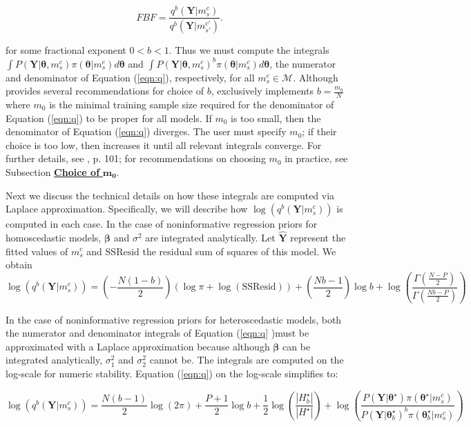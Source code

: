 $$FBF=\frac{q^b(\boldsymbol{Y}|m_s^c)}{q^b(\boldsymbol{Y}|m_{s'}^{c'})}.$$

\noindent 
for some fractional exponent $0<b<1$. Thus we must compute the integrals $\int P(\boldsymbol{Y}|\boldsymbol{\theta},m_s^c)\pi(\boldsymbol{\theta}|m_s^c)d\boldsymbol{\theta}$ and $\int P(\boldsymbol{Y}|\boldsymbol{\theta},m_s^c)^b\pi(\boldsymbol{\theta}|m_s^c)d\boldsymbol{\theta}$, the numerator and denominator of Equation (\ref{eqn:q}), respectively, for all $m_s^c\in \mathcal{M}$. Although \citet{OHaganfbfs} provides several recommendations for choice of $b$,  exclusively implements $b=\frac{m_0}{N}$ where $m_0$ is the minimal training sample size required for the denominator of Equation (\ref{eqn:q}) to be proper for all models. If $m_0$ is too small, then the denominator of Equation (\ref{eqn:q}) diverges. The user must specify $m_0$; if their choice is too low, then  increases it until all relevant integrals converge. For further details, see \citet{OHaganfbfs}, p. 101; for recommendations on choosing $m_0$ in practice, see Subsection \hyperlink{subsection:m0}{\textbf{Choice of }$\mathbf{m_0}$}. 

Next we discuss the technical details on how these integrals are computed via Laplace approximation. Specifically, we will describe how $\log\left(q^b(\boldsymbol{Y}|m_s^c)\right)$ is computed in each case. In the case of noninformative regression priors for homoscedastic models, $\boldsymbol{\beta}$ and $\sigma^2$ are integrated analytically. Let $\hat{\boldsymbol{Y}}$ represent the fitted values of $m_s^c$ and $\text{SSResid}$ the residual sum of squares of this model. We obtain 
\begin{equation}
\log\left(q^b(\boldsymbol{Y}|m_s^c)\right)=\left(-\frac{N(1-b)}{2}\right)(\log\pi+\log(\text{SSResid}))+\left({\frac{Nb-1}{2}}\right)\log b+\log\left(\frac{\Gamma\left(\frac{ N-P}{2}\right)}{\Gamma\left(\frac{Nb-P}{2}\right)}\right)
\end{equation}

\noindent In the case of noninformative regression priors for heteroscedastic models, both the numerator and denominator integrals of Equation (\ref{eqn:q} )must be approximated with a Laplace approximation because although $\boldsymbol{\beta}$ can be integrated analytically, $\sigma^2_1$ and $\sigma^2_2$ cannot be. The integrals are computed on the log-scale for numeric stability. Equation (\ref{eqn:q}) on the log-scale simplifies to:

\begin{equation}
\log\left(q^b(\boldsymbol{Y}|m_s^c)\right)=\frac{N(b-1)}{2}\log(2\pi)+\frac{P+1}{2}\log b + \frac{1}{2}\log\left(\frac{|H_b^{\star}|}{|H^{{\star}}|}\right) + \log\left(\frac{P(\boldsymbol{Y}|\boldsymbol{\theta}^{{\star}})\pi(\boldsymbol{\theta}^{\star}|m_s^c)}{P(\boldsymbol{Y}|\boldsymbol{\theta}_b^{{\star}})^b\pi(\boldsymbol{\theta}^{\star}_b|m_s^c)}\right)
\end{equation}

